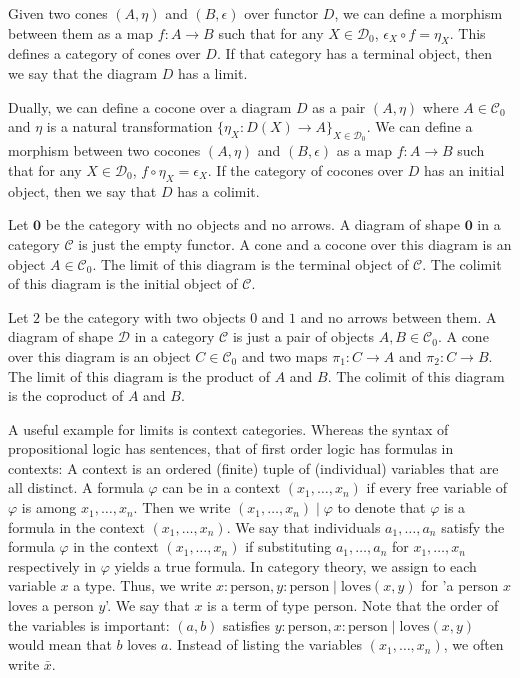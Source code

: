Given two cones $(A,\eta)$ and $(B,\epsilon)$ over functor $D$,
we can define a morphism between them as a map $f:A\to B$ such that
for any $X\in\mathcal{D}_0$, $\epsilon_X\circ f=\eta_X$.
This defines a category of cones over $D$.
If that category has a terminal object, 
then we say that the diagram $D$ has a limit.

\begin{remark}
    Dually, we can define a cocone over a diagram $D$ as a pair $(A,\eta)$
    where $A\in\mathcal{C}_0$ and $\eta$ is a natural transformation
    $\{\eta_X:D(X)\to A\}_{X\in\mathcal{D}_0}$.
    We can define a morphism between two cocones $(A,\eta)$ and $(B,\epsilon)$
    as a map $f:A\to B$ such that for any $X\in\mathcal{D}_0$, $f\circ \eta_X=\epsilon_X$.
    If the category of cocones over $D$ has an initial object, then we say that $D$ has a colimit.
\end{remark}

\begin{example}
    Let $\mathbf{0}$ be the category with no objects and no arrows.
    A diagram of shape $\mathbf{0}$ in a category $\mathcal{C}$ is just the empty functor.
    A cone and a cocone over this diagram is an object $A\in\mathcal{C}_0$.
    The limit of this diagram is the terminal object of $\mathcal{C}$.
    The colimit of this diagram is the initial object of $\mathcal{C}$.
\end{example}

\begin{example}
    Let $\mathcal{2}$ be the category with two objects $0$ and $1$ 
    and no arrows between them.
    A diagram of shape $\mathcal{D}$ in a category $\mathcal{C}$
    is just a pair of objects $A,B\in\mathcal{C}_0$.
    A cone over this diagram is an object $C\in\mathcal{C}_0$
    and two maps $\pi_1:C\to A$ and $\pi_2:C\to B$.
    The limit of this diagram is the product of $A$ and $B$.
    The colimit of this diagram is the coproduct of $A$ and $B$.
\end{example}

A useful example for limits is context categories.
Whereas the syntax of propositional logic has sentences, that of first order logic has
formulas in contexts: A context is an ordered (finite) tuple of (individual) variables that
are all distinct. A formula $\varphi$ can be in a context $(x_1,\dots,x_n)$ if every free variable of
$\varphi$ is among $x_1,\dots,x_n$. Then we write
$(x_1,\dots,x_n)\mid \varphi$
to denote that $\varphi$ is a formula in the context $(x_1,\dots,x_n)$.
We say that individuals $a_1,\dots,a_n$ satisfy the formula $\varphi$ in the context $(x_1,\dots,x_n)$
if substituting $a_1,\dots,a_n$ for $x_1,\dots,x_n$ respectively in $\varphi$ yields a true formula.
In category theory, we assign to each variable $x$ a type.
Thus, we write
$x:\text{person},y:\text{person}\mid \text{loves}(x,y)$ for 'a person $x$ loves a person $y$'.
We say that $x$ is a term of type $\text{person}$.
Note that the order of the variables is important: $(a,b)$ satisfies 
$y:\text{person},x:\text{person}\mid \text{loves}(x,y)$ 
would mean that $b$ loves $a$. Instead of listing the variables $(x_1,\dots,x_n)$,
we often write $\bar{x}$.


